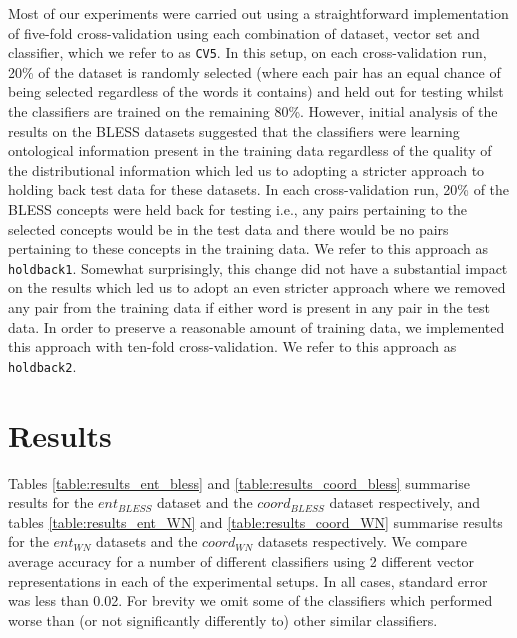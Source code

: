\documentclass[11pt]{article}
\begin{document}
Most of our experiments were carried out using a straightforward implementation of five-fold cross-validation using each combination of dataset, vector set and classifier, which we refer to as \texttt{CV5}.  In this setup, on each cross-validation run, 20\% of the dataset is randomly selected (where each pair has an equal chance of being selected regardless of the words it contains) and held out for testing whilst the classifiers are trained on the remaining 80\%.  However, initial analysis of the results on the BLESS datasets suggested that the classifiers were learning ontological information present in the training data regardless of the quality of the distributional information which led us to adopting a stricter approach to holding back test data for these datasets.  In each cross-validation run, 20\% of the BLESS concepts were held back for testing i.e., any pairs pertaining to the selected concepts would be in the test data and there would be no pairs pertaining to these concepts in the training data.  We refer to this approach as \texttt{holdback1}.  Somewhat surprisingly, this change did not have a substantial impact on the results which led us to adopt an even stricter approach where we removed any pair from the training data if either word is present in any pair in the test data.  In order to preserve a reasonable amount of training data, we implemented this approach with ten-fold cross-validation.  We refer to this approach as \texttt{holdback2}.

\section{Results}
\label{sect:results}

Tables \ref{table:results_ent_bless} and \ref{table:results_coord_bless} summarise results for the $ent_{BLESS}$ dataset and the $coord_{BLESS}$ dataset respectively, and tables \ref{table:results_ent_WN} and \ref{table:results_coord_WN} summarise results for the $ent_{WN}$ datasets and the $coord_{WN}$ datasets respectively.  We compare average accuracy for a number of different classifiers using 2 different vector representations in each of the experimental setups.  In all cases, standard error was less than 0.02.  For brevity we omit some of the classifiers which performed worse than (or not significantly differently to) other similar classifiers.
\end{document}
